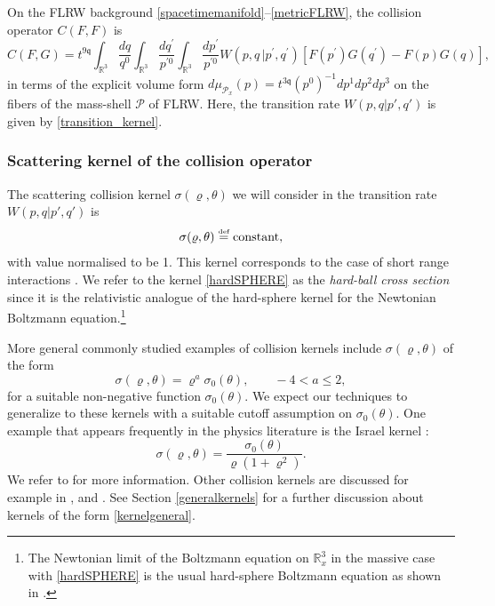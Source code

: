 \documentclass[reqno]{amsart}
\newcommand{\eqdef }{\overset{\mbox{\tiny{def}}}{=}}
\newcommand{\pv}{p}
\newcommand{\qv}{q}
\newcommand{\pZprime}{\pv^{\prime 0}}
\newcommand{\qZprime}{\pv^{\prime 0}}
\newcommand{\qZzero}{\qv^{0}}
\newcommand{\threed}{{\mathbb R}^3}
\newcommand{\qq}{\mathfrak{q}}
\newcommand{\mrel}{\varrho}
\theoremstyle{definition}
\numberwithin{equation}{section}
\numberwithin{theorem}{section}
\begin{document}
On the FLRW background \eqref{spacetimemanifold}--\eqref{metricFLRW}, the collision operator \(C(F,F)\) is 
\begin{equation}\label{collisionop}
C(F,G) =  t^{9\qq}\int_{\threed} \frac{dq}{\qZzero}
\int_{\threed}\frac{dq^\prime}{\qZprime}
\int_{\threed}\frac{dp^\prime}{\pZprime}
W(p, q \,| p^\prime, q^\prime) [F(p^{\prime})G(q^{\prime})-F(p)G(q)], 
\end{equation}
in terms of the explicit volume form \(d\mu_{\mathcal{P}_{x}}(p)=t^{3\qq}(p^0)^{-1} dp^1dp^2dp^3\) on the fibers of the mass-shell \(\mathcal{P}\) of FLRW. 
Here, the transition rate \(W(p,q|p',q')\) is given by \eqref{transition_kernel}. 



\subsubsection{Scattering kernel of the collision operator}





The scattering collision kernel \(\sigma (\varrho,\theta)\) we will consider in the transition rate \(W(p,q|p',q')\) is
\begin{equation}
\sigma (\varrho,\theta)\eqdef \text{constant},
\label{hardSPHERE}
\end{equation}
with value normalised to be 1. This kernel corresponds to the case of short range interactions \cite{MR1402248,MR1958975}. We refer to the kernel \eqref{hardSPHERE} as the \emph{hard-ball cross section} since it is the relativistic analogue of the hard-sphere kernel for the Newtonian Boltzmann equation.\footnote{The Newtonian limit of the Boltzmann equation on \(\mathbb{R}^3_x\) in the massive case with \eqref{hardSPHERE} is the usual hard-sphere Boltzmann equation as shown in \cite{MR2679588}. }




More general commonly studied examples of collision kernels include $\sigma (\mrel,\theta )$ of the form
\begin{equation}\label{kernelgeneral}
    \sigma (\mrel,\theta ) = \mrel^a \sigma_0(\theta), \quad  \quad -4<a\leq  2,
\end{equation}
for a suitable non-negative function \(\sigma_0(\theta)\). We expect our techniques to generalize to these kernels with a suitable cutoff assumption on $\sigma_0(\theta)$. One example that appears frequently in the physics literature is the Israel kernel \cite{MR165921}:
\begin{equation}\label{israelkernel}
\sigma(\mrel,\theta)=\frac{\sigma_0(\theta)}{\mrel(1+\mrel^2)} .    
\end{equation}
We refer to \cite{MR3186493} for more information. Other collision kernels are discussed for example in \cite[Appendix B]{MR2679588}, and \cite{MR635279, MR471665}. See Section \ref{generalkernels} for a further discussion about kernels of the form \eqref{kernelgeneral}.
\end{document}
